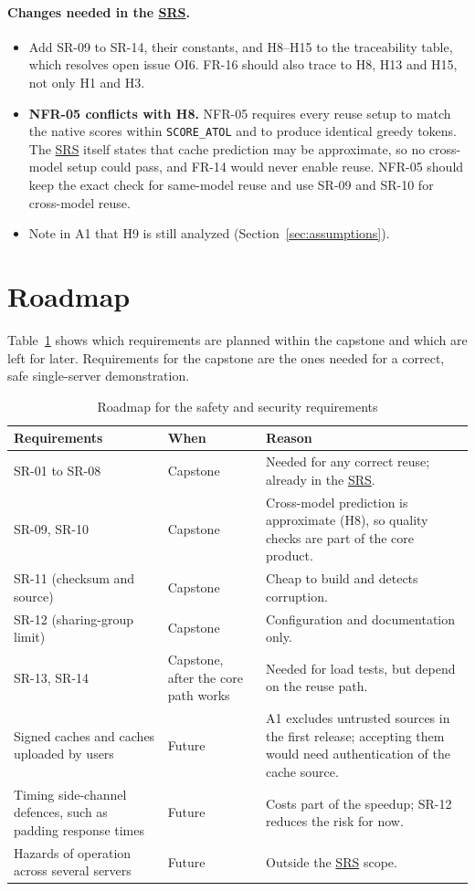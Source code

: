 \documentclass{article}
\newcommand{\srs}{\href{../SRS-Volere/SRS.pdf}{SRS}}
\begin{document}
\paragraph{Changes needed in the \srs{}.}
\begin{itemize}
  \item Add SR-09 to SR-14, their constants, and H8--H15 to the traceability
  table, which resolves open issue OI6. FR-16 should also trace to H8, H13
  and H15, not only H1 and H3.
  \item \textbf{NFR-05 conflicts with H8.} NFR-05 requires every reuse
  setup to match the native scores within \texttt{SCORE\_ATOL} and to
  produce identical greedy tokens. The \srs{} itself states that cache
  prediction may be approximate, so no cross-model setup could pass, and
  FR-14 would never enable reuse. NFR-05
  should keep the exact check for same-model reuse and use SR-09 and SR-10
  for cross-model reuse. 
  \item Note in A1 that H9 is still analyzed (Section~\ref{sec:assumptions}).
\end{itemize}

\section{Roadmap}
\label{sec:roadmap}

Table~\ref{tab:roadmap} shows which requirements are planned within the
capstone and which are left for later. Requirements for the capstone are
the ones needed for a correct, safe single-server demonstration.

\begin{table}[h]
\centering
\caption{Roadmap for the safety and security requirements}
\label{tab:roadmap}
\begin{tabularx}{\textwidth}{@{}p{}p{}X@{}}
\toprule Requirements & When & Reason\\\midrule
SR-01 to SR-08 & Capstone & Needed for any correct reuse; already in the
\srs{}.\\
SR-09, SR-10 & Capstone & Cross-model prediction is approximate (H8), so
quality checks are part of the core product.\\
SR-11 (checksum and source) & Capstone & Cheap to build and detects
corruption.\\
SR-12 (sharing-group limit) & Capstone & Configuration and documentation
only.\\
SR-13, SR-14 & Capstone, after the core path works & Needed for load tests,
but depend on the reuse path.\\
Signed caches and caches uploaded by users & Future & A1 excludes untrusted
sources in the first release; accepting them would need authentication of
the cache source.\\
Timing side-channel defences, such as padding response times & Future &
Costs part of the speedup; SR-12 reduces the risk for now.\\
Hazards of operation across several servers & Future & Outside the
\srs{} scope.\\
\bottomrule
\end{tabularx}
\end{table}
\end{document}
